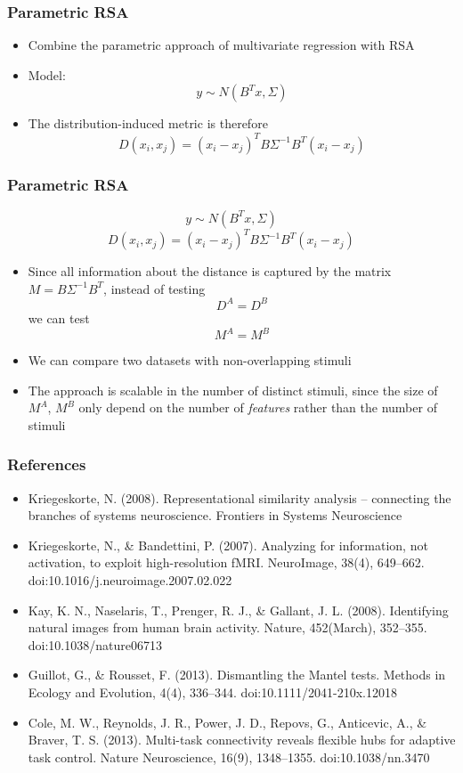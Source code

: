 \documentclass{beamer}
\begin{document}
\begin{frame}
\frametitle{Parametric RSA}
\begin{itemize}
\item Combine the parametric approach of multivariate regression with RSA
\item Model:
\[
y \sim N(B^T x, \Sigma)
\]
\item The distribution-induced metric is therefore
\[
D(x_i, x_j) = (x_i - x_j)^T B \Sigma^{-1} B^T (x_i - x_j)
\]
\end{itemize}
\end{frame}

\begin{frame}
\frametitle{Parametric RSA}
\[
y \sim N(B^T x, \Sigma)
\]
\[
D(x_i, x_j) = (x_i - x_j)^T B \Sigma^{-1} B^T (x_i - x_j)
\]
\begin{itemize}
\item Since all information about the distance is captured by the matrix $M = B\Sigma^{-1}B^T$, instead of testing
\[
D^A = D^B
\]
we can test
\[
M^A = M^B
\]
\item We can compare two datasets with non-overlapping stimuli
\item The approach is scalable in the number of distinct stimuli,
  since the size of $M^A$, $M^B$ only depend on the number of
  \emph{features} rather than the number of stimuli
\end{itemize}
\end{frame}

\begin{frame}
\frametitle{References}
\begin{itemize}
\item Kriegeskorte, N. (2008). Representational similarity analysis – connecting the branches of systems neuroscience. Frontiers in Systems Neuroscience
\item Kriegeskorte, N., \& Bandettini, P. (2007). Analyzing for information, not activation, to exploit high-resolution fMRI. NeuroImage, 38(4), 649–662. doi:10.1016/j.neuroimage.2007.02.022
\item Kay, K. N., Naselaris, T., Prenger, R. J., \& Gallant, J. L. (2008). Identifying natural images from human brain activity. Nature, 452(March), 352–355. doi:10.1038/nature06713
\item Guillot, G., \& Rousset, F. (2013). Dismantling the Mantel tests. Methods in Ecology and Evolution, 4(4), 336–344. doi:10.1111/2041-210x.12018
\item Cole, M. W., Reynolds, J. R., Power, J. D., Repovs, G., Anticevic, A., \& Braver, T. S. (2013). Multi-task connectivity reveals flexible hubs for adaptive task control. Nature Neuroscience, 16(9), 1348–1355. doi:10.1038/nn.3470
\end{itemize}
\end{frame}
\end{document}
